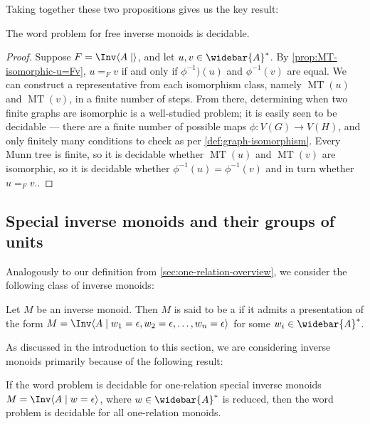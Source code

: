 \documentclass[noindex,noinsetproof,emphthm,12pt]{lmaths}
\newcommand{\Abar}{\widebar{A}}
\DeclareMathOperator{\MT}{MT}
\begin{document}
\begin{comment}
\begin{theorem} \label{thm:equal-FIM-iff-Munn-isomorphic}
	Let $u, v \in F = \Inv \langle A\mid\rangle$. Then $u =_F v$ if and only if $\MT(u)$ and $\MT(v)$ are isomorphic as birooted trees, i.e. they are isomorphic as graphs and vertices labelled $\alpha$ and $\beta$ in $\MT(u)$ have their images labelled $\alpha$ and $\beta$ in $\MT(v)$ under $\phi$.
\end{theorem}
\end{comment}

Taking together these two propositions gives us the key result:

\begin{theorem}
	The word problem for free inverse monoids is decidable.
\end{theorem}
\begin{proof}
	Suppose $F = \Inv \langle A \mid\rangle$, and let $u, v \in \Abar^*$. By \cref{prop:MT-isomorphic-u=Fv}, $u =_F v$ if and only if $\phi^{-1})(u)$ and $\phi^{-1}(v)$ are equal. We can construct a representative from each isomorphism class, namely $\MT(u)$ and $\MT(v)$, in a finite number of steps. From there, determining when two finite graphs are isomorphic is a well-studied problem; it is easily seen to be decidable --- there are a finite number of possible maps $\phi : V(G) \to V(H)$, and only finitely many conditions to check as per \cref{def:graph-isomorphism}. Every Munn tree is finite, so it is decidable whether $\MT(u)$ and $\MT(v)$ are isomorphic, so it is decidable whether $\phi^{-1}(u) = \phi^{-1}(v)$ and in turn whether $u =_F v$..
\end{proof}

\subsection{Special inverse monoids and their groups of units}

Analogously to our definition from \cref{sec:one-relation-overview}, we consider the following class of inverse monoids:
\begin{defn}
	Let $M$ be an inverse monoid. Then $M$ is said to be a  if it admits a presentation of the form $M = \Inv \langle A \mid w_1 = \epsilon, w_2 = \epsilon, \ldots, w_n = \epsilon \rangle$ for some $w_i \in \Abar^*$.
\end{defn}

As discussed in the introduction to this section, we are considering inverse monoids primarily because of the following result:
\begin{theorem}
	If the word problem is decidable for one-relation special inverse monoids $M = \Inv \langle A \mid w = \epsilon\rangle$, where $w \in \Abar^*$ is reduced, then the word problem is decidable for all one-relation monoids.
\end{theorem}
\end{document}
